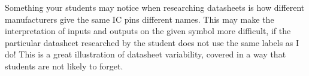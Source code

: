 Something your students may notice when researching datasheets is how different manufacturers give the same IC pins different names.  This may make the interpretation of inputs and outputs on the given symbol more difficult, if the particular datasheet researched by the student does not use the same labels as I do!  This is a great illustration of datasheet variability, covered in a way that students are not likely to forget.




